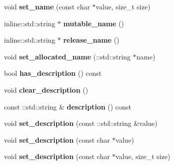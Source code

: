 \begin{DoxyCompactItemize}
\item 
\hypertarget{class_game_entity_a7004ef266061469a6b39052baf579cf9}{}void {\bfseries set\+\_\+name} (const char $\ast$value, size\+\_\+t size)\label{class_game_entity_a7004ef266061469a6b39052baf579cf9}

\item 
\hypertarget{class_game_entity_a81a39f375d3e5914d3339d45d518233b}{}inline\+::std\+::string $\ast$ {\bfseries mutable\+\_\+name} ()\label{class_game_entity_a81a39f375d3e5914d3339d45d518233b}

\item 
\hypertarget{class_game_entity_a22cff7dee6991f873fe096ba82230988}{}inline\+::std\+::string $\ast$ {\bfseries release\+\_\+name} ()\label{class_game_entity_a22cff7dee6991f873fe096ba82230988}

\item 
\hypertarget{class_game_entity_a92c6ebce60eff2803ff387af4b867da0}{}void {\bfseries set\+\_\+allocated\+\_\+name} (\+::std\+::string $\ast$name)\label{class_game_entity_a92c6ebce60eff2803ff387af4b867da0}

\item 
\hypertarget{class_game_entity_a95649eb24f47bac1152da548d34fb742}{}bool {\bfseries has\+\_\+description} () const \label{class_game_entity_a95649eb24f47bac1152da548d34fb742}

\item 
\hypertarget{class_game_entity_a72fb20413ba6dde033f5c2179c053f99}{}void {\bfseries clear\+\_\+description} ()\label{class_game_entity_a72fb20413ba6dde033f5c2179c053f99}

\item 
\hypertarget{class_game_entity_a3441f1430479ddb262dd3535112ab901}{}const \+::std\+::string \& {\bfseries description} () const \label{class_game_entity_a3441f1430479ddb262dd3535112ab901}

\item 
\hypertarget{class_game_entity_ad836eb0089916b4959a73e015d154408}{}void {\bfseries set\+\_\+description} (const \+::std\+::string \&value)\label{class_game_entity_ad836eb0089916b4959a73e015d154408}

\item 
\hypertarget{class_game_entity_a381d51b25532bdec6f852cc4a10221c0}{}void {\bfseries set\+\_\+description} (const char $\ast$value)\label{class_game_entity_a381d51b25532bdec6f852cc4a10221c0}

\item 
\hypertarget{class_game_entity_a2e744ca8dbddbfa72f06b0681fd3ad6f}{}void {\bfseries set\+\_\+description} (const char $\ast$value, size\+\_\+t size)\label{class_game_entity_a2e744ca8dbddbfa72f06b0681fd3ad6f}


\end{DoxyCompactItemize}
